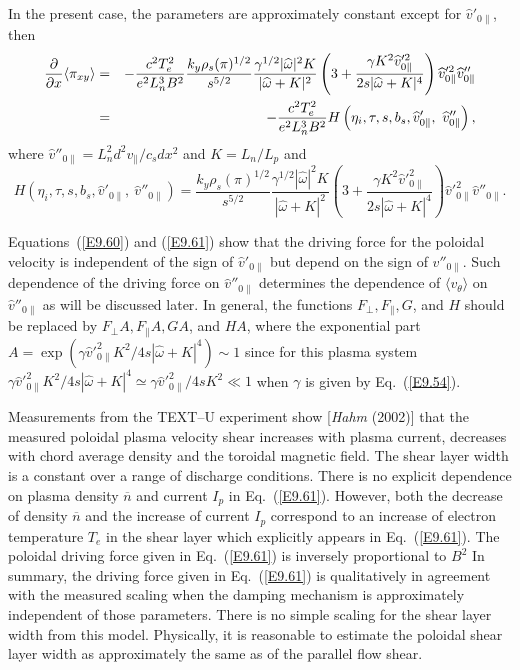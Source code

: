 \documentclass[a4paper,openany,12pt]{book}
\begin{document}
{In the present case, the parameters are approximately constant except for $\widehat v'_{0\|}$, then
\begin{eqnarray}
{\partial\over\partial x}\langle\pi_{xy}\rangle&=&-{c^2T_e^2\over e^2L_n^3B^2}
{k_y\rho_s(\pi)^{1/2}\over s^{5/2}}{\gamma^{1/2}|\widehat\omega|^2K\over |\widehat\omega+K|^2}\left(3+{\gamma K^2\widehat v'^2_{0\|}\over 2s|\widehat\omega+K|^4}\right)\widehat v'^2_{0\|}\widehat v''_{0\|}\nonumber\\
&=&-{c^2T_e^2\over e^2L_n^3B^2}H\left(\eta_i, \tau, s, b_s, \widehat v'_{0\|},\ \widehat v''_{0\|}\right) ,\label{E9.61}
\end{eqnarray}
where $\widehat v''_{0\|}=L_n^2d^2v_\|/c_sdx^2$ and $K=L_n/L_p$ and
$$H(\eta_i, \tau, s, b_s, \widehat v'_{0\|},\ \widehat v''_{0\|})=\frac{k_y\rho_s
(\pi)^{1/2}}{s^{5/2}}\frac{\gamma^{1/2}|
\widehat\omega|^2K}{|\widehat\omega+K|^2}(3+\frac{\gamma K^2\widehat v'^2_{0\|}}{2s|\widehat\omega+K|^4})\widehat v'^2_{0\|}\widehat v''_{0\|}.$$

Equations~(\ref{E9.60}) and (\ref{E9.61}) show that the driving force for the poloidal velocity is independent of the sign of $\widehat v'_{0\|}$ but depend on the sign of $\widehat v''_{0\|}$. Such dependence of the driving force on $\widehat v''_{0\|}$ determines the dependence of $\langle v_\theta\rangle$ on $\widehat v''_{0\|}$ as will be discussed later. In general, the functions $F_\perp, F_\|, G$, and $H$ should be replaced by $F_\perp A, F_\|A, GA$, and $HA$, where the exponential part $A=\exp(\gamma\widehat v'^2_{0\|}K^2/4s|\widehat\omega+K|^4)\sim 1$ since for this plasma system $\gamma\widehat v'^2_{0\|}K^2/4s|\widehat\omega+K|^4\simeq\gamma\widehat v'^2_{0\|}/4sK^2\ll 1$ when $\gamma$ is given by Eq.~(\ref{E9.54}).

Measurements from the TEXT--U experiment show [\emph{Hahm} (2002)] that the measured poloidal plasma velocity shear increases with plasma current, decreases with chord average density and the toroidal magnetic field. The shear layer width is a constant over a range of discharge conditions. There is no explicit dependence on plasma density $\overline n$ and current $I_p$ in Eq.~(\ref{E9.61}). However, both the decrease of density $\overline n$ and the increase of current $I_p$ correspond to an increase of electron temperature $T_e$ in the shear layer which explicitly appears in Eq.~(\ref{E9.61}). The poloidal driving force given in Eq.~(\ref{E9.61}) is inversely proportional to $B^2$ In summary, the driving force given in Eq.~(\ref{E9.61}) is qualitatively in agreement with the measured scaling when the damping mechanism is approximately independent of those parameters. There is no simple scaling for the shear layer width from this model. Physically, it is reasonable to estimate the poloidal shear layer width as approximately the same as of the parallel flow shear.

}
\end{document}
